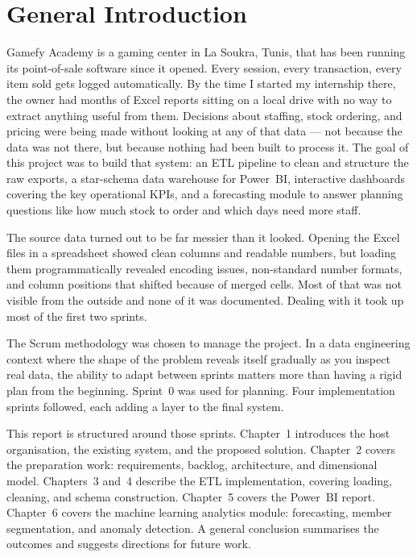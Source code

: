 \documentclass[12pt, a4paper]{report}
\begin{document}
\newpage

\chapter*{General Introduction}

Gamefy Academy is a gaming center in La Soukra, Tunis, that has been running its
point-of-sale software since it opened. Every session, every transaction, every item
sold gets logged automatically. By the time I started my internship there, the owner
had months of Excel reports sitting on a local drive with no way to extract anything
useful from them. Decisions about staffing, stock ordering, and pricing were being
made without looking at any of that data --- not because the data was not there, but
because nothing had been built to process it. The goal of this project was to build
that system: an ETL pipeline to clean and structure the raw exports, a star-schema
data warehouse for Power~BI, interactive dashboards covering the key operational
KPIs, and a forecasting module to answer planning questions like how much stock to
order and which days need more staff.

The source data turned out to be far messier than it looked. Opening the Excel files
in a spreadsheet showed clean columns and readable numbers, but loading them
programmatically revealed encoding issues, non-standard number formats, and column
positions that shifted because of merged cells. Most of that was not visible from
the outside and none of it was documented. Dealing with it took up most of the
first two sprints.

The Scrum methodology was chosen to manage the project. In a data engineering
context where the shape of the problem reveals itself gradually as you inspect real
data, the ability to adapt between sprints matters more than having a rigid plan
from the beginning. Sprint~0 was used for planning. Four implementation sprints
followed, each adding a layer to the final system.

This report is structured around those sprints. Chapter~1 introduces the host
organisation, the existing system, and the proposed solution. Chapter~2 covers the
preparation work: requirements, backlog, architecture, and dimensional model.
Chapters~3 and~4 describe the ETL implementation, covering loading, cleaning, and schema
construction. Chapter~5 covers the Power~BI report. Chapter~6 covers the machine learning analytics module: forecasting, member
segmentation, and anomaly detection. A general conclusion summarises the outcomes
and suggests directions for future work.
\end{document}
